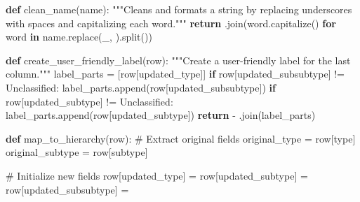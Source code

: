 \documentclass[
  letterpaper,
  DIV=11,
  numbers=noendperiod]{scrartcl}
\newenvironment{Shaded}{\begin{snugshade}}{\end{snugshade}}
\newcommand{\CommentTok}[1]{\textcolor[rgb]{0.37,0.37,0.37}{#1}}
\newcommand{\ControlFlowTok}[1]{\textcolor[rgb]{0.00,0.23,0.31}{\textbf{#1}}}
\newcommand{\KeywordTok}[1]{\textcolor[rgb]{0.00,0.23,0.31}{\textbf{#1}}}
\newcommand{\NormalTok}[1]{\textcolor[rgb]{0.00,0.23,0.31}{#1}}
\newcommand{\OperatorTok}[1]{\textcolor[rgb]{0.37,0.37,0.37}{#1}}
\newcommand{\StringTok}[1]{\textcolor[rgb]{0.13,0.47,0.30}{#1}}
\begin{document}
\begin{Shaded}
\begin{Highlighting}[]
\KeywordTok{def}\NormalTok{ clean\_name(name):}
    \CommentTok{"""Cleans and formats a string by replacing underscores with spaces and capitalizing each word."""}
    \ControlFlowTok{return} \StringTok{\textquotesingle{} \textquotesingle{}}\NormalTok{.join(word.capitalize() }\ControlFlowTok{for}\NormalTok{ word }\KeywordTok{in}\NormalTok{ name.replace(}\StringTok{\textquotesingle{}\_\textquotesingle{}}\NormalTok{, }\StringTok{\textquotesingle{} \textquotesingle{}}\NormalTok{).split())}

\KeywordTok{def}\NormalTok{ create\_user\_friendly\_label(row):}
    \CommentTok{"""Create a user{-}friendly label for the last column."""}
\NormalTok{    label\_parts }\OperatorTok{=}\NormalTok{ [row[}\StringTok{\textquotesingle{}updated\_type\textquotesingle{}}\NormalTok{]]}
    \ControlFlowTok{if}\NormalTok{ row[}\StringTok{\textquotesingle{}updated\_subsubtype\textquotesingle{}}\NormalTok{] }\OperatorTok{!=} \StringTok{\textquotesingle{}Unclassified\textquotesingle{}}\NormalTok{:}
\NormalTok{        label\_parts.append(row[}\StringTok{\textquotesingle{}updated\_subsubtype\textquotesingle{}}\NormalTok{])}
    \ControlFlowTok{if}\NormalTok{ row[}\StringTok{\textquotesingle{}updated\_subtype\textquotesingle{}}\NormalTok{] }\OperatorTok{!=} \StringTok{\textquotesingle{}Unclassified\textquotesingle{}}\NormalTok{:}
\NormalTok{        label\_parts.append(row[}\StringTok{\textquotesingle{}updated\_subtype\textquotesingle{}}\NormalTok{])}
    \ControlFlowTok{return} \StringTok{\textquotesingle{} {-} \textquotesingle{}}\NormalTok{.join(label\_parts)}

\KeywordTok{def}\NormalTok{ map\_to\_hierarchy(row): }
    \CommentTok{\# Extract original fields}
\NormalTok{    original\_type }\OperatorTok{=}\NormalTok{ row[}\StringTok{\textquotesingle{}type\textquotesingle{}}\NormalTok{]}
\NormalTok{    original\_subtype }\OperatorTok{=}\NormalTok{ row[}\StringTok{\textquotesingle{}subtype\textquotesingle{}}\NormalTok{]}
    
    \CommentTok{\# Initialize new fields}
\NormalTok{    row[}\StringTok{\textquotesingle{}updated\_type\textquotesingle{}}\NormalTok{] }\OperatorTok{=} \StringTok{\textquotesingle{}\textquotesingle{}}
\NormalTok{    row[}\StringTok{\textquotesingle{}updated\_subtype\textquotesingle{}}\NormalTok{] }\OperatorTok{=} \StringTok{\textquotesingle{}\textquotesingle{}}
\NormalTok{    row[}\StringTok{\textquotesingle{}updated\_subsubtype\textquotesingle{}}\NormalTok{] }\OperatorTok{=} \StringTok{\textquotesingle{}\textquotesingle{}}
    

\end{Highlighting}
\end{Shaded}
\end{document}
